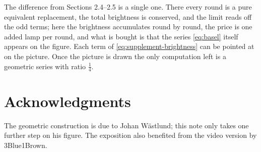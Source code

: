 The difference from Sections 2.4--2.5 is a single one. There every round is a pure equivalent
replacement, the total brightness is conserved, and the limit reads off the odd terms; here
the brightness accumulates round by round, the price is one added lamp per round, and what is
bought is that the series \eqref{eq:basel} itself appears on the figure. Each term of
\eqref{eq:supplement-brightness} can be pointed at on the picture. Once the picture is drawn
the only computation left is a geometric series with ratio $\frac14$.

\section*{Acknowledgments}

The geometric construction is due to Johan W\"astlund; this note only takes one further step
on his figure. The exposition also benefited from the video version by 3Blue1Brown.
